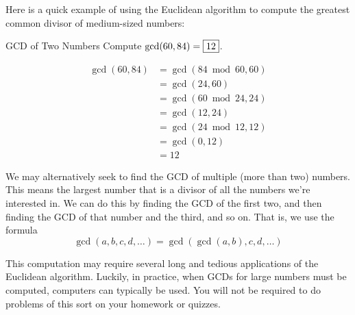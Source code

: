 \documentclass[a4paper,10pt]{report}
\begin{document}
Here is a quick example of using the Euclidean algorithm to compute the
greatest common divisor of medium-sized numbers:

\begin{problem}{GCD of Two Numbers}
 Compute \(\gcd(60, 84) = \Ans{12}\).

 \begin{solution}
  \begin{align*}
   \gcd(60, 84)
   &= \gcd(84 \bmod 60, 60) \\
   &= \gcd(24, 60) \\
   &= \gcd(60 \bmod 24, 24) \\
   &= \gcd(12, 24) \\
   &= \gcd(24 \bmod 12, 12) \\
   &= \gcd(0, 12) \\
   &= 12
  \end{align*}
 \end{solution}
\end{problem}

We may alternatively seek to find the GCD of multiple (more than two) numbers.
This means the largest number that is a divisor of all the numbers we're
interested in. We can do this by finding the GCD of the first two, and then
finding the GCD of that number and the third, and so on. That is, we use the
formula \[
 \gcd(a, b, c, d, \dots) = \gcd(\gcd(a, b), c, d, \dots)
\]

This computation may require several long and tedious applications of the
Euclidean algorithm. Luckily, in practice, when GCDs for large numbers must be
computed, computers can typically be used. You will not be required to do
problems of this sort on your homework or quizzes.
\end{document}
